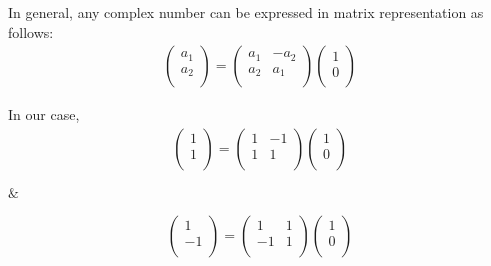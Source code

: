 \documentclass[journal,12pt,twocolumn]{IEEEtran}
\begin{document}
In general, any complex number can be expressed in matrix representation as follows:\\
\begin{align}
     \begin{pmatrix}
      a_1 \\ 
      a_2 \\
      \end{pmatrix} = \begin{pmatrix}
      a_1    & -a_2\\ 
      a_2    & a_1\\
      \end{pmatrix}\begin{pmatrix}
      1\\ 
      0\\
      \end{pmatrix}
\end{align}

In our case, \\
\begin{align}
     \begin{pmatrix}
      1 \\ 
      1 \\
      \end{pmatrix} = \begin{pmatrix}
      1    & -1\\ 
      1    & 1\\
      \end{pmatrix}\begin{pmatrix}
      1\\ 
      0\\
      \end{pmatrix}
\end{align}

$\&$

\begin{align}
     \begin{pmatrix}
      1 \\ 
      -1 \\
      \end{pmatrix} = \begin{pmatrix}
      1    & 1\\ 
      -1    & 1\\
      \end{pmatrix}\begin{pmatrix}
      1\\ 
      0\\
      \end{pmatrix}
\end{align}
\end{document}

